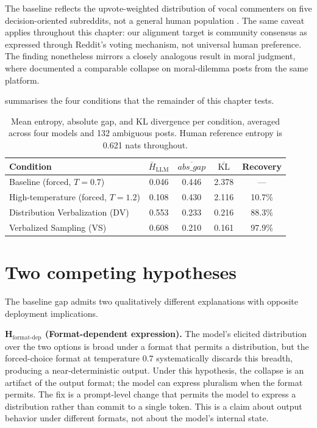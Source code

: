 The baseline reflects the upvote-weighted distribution of vocal
commenters on five decision-oriented subreddits, not a general human
population \citep{sachdeva-2025-aita}. The same caveat applies
throughout this chapter: our alignment target is community consensus as
expressed through Reddit's voting mechanism, not universal human
preference. The finding nonetheless mirrors a closely analogous result
in moral judgment, where \citet{russo-2026-pluralistic} documented a
comparable collapse on moral-dilemma posts from the same platform.

 summarises the four conditions that the
remainder of this chapter tests.

\begin{table}[t]
  \centering
  \caption{Mean entropy, absolute gap, and KL divergence per condition,
    averaged across four models and 132 ambiguous posts. Human reference
    entropy is 0.621 nats throughout.}
  \label{tab:d1_conditions}
  \begin{tabular}{lcccc}
    \toprule
    Condition & $\bar{H}_{\text{LLM}}$ & $\overline{\textit{abs\_gap}}$
              & $\overline{\text{KL}}$ & Recovery \\
    \midrule
    Baseline (forced, $T{=}0.7$)         & 0.046 & 0.446 & 2.378 & — \\
    High-temperature (forced, $T{=}1.2$) & 0.108 & 0.430 & 2.116 & 10.7\% \\
    Distribution Verbalization (DV)      & 0.553 & 0.233 & 0.216 & 88.3\% \\
    Verbalized Sampling (VS)             & 0.608 & 0.210 & 0.161 & 97.9\% \\
    \bottomrule
  \end{tabular}
\end{table}

\section{Two competing hypotheses}
\label{sec:d1_hypotheses}

The baseline gap admits two qualitatively different explanations with
opposite deployment implications.

\textbf{H$_{\text{format-dep}}$ (Format-dependent expression).} The
model's elicited distribution over the two options is broad under a
format that permits a distribution, but the forced-choice format at
temperature 0.7 systematically discards this breadth, producing a
near-deterministic output. Under this hypothesis, the collapse is an
artifact of the output format; the model can express pluralism when the
format permits. The fix is a prompt-level change that permits the model
to express a distribution rather than commit to a single token. This is
a claim about output behavior under different formats, not about the
model's internal state.

